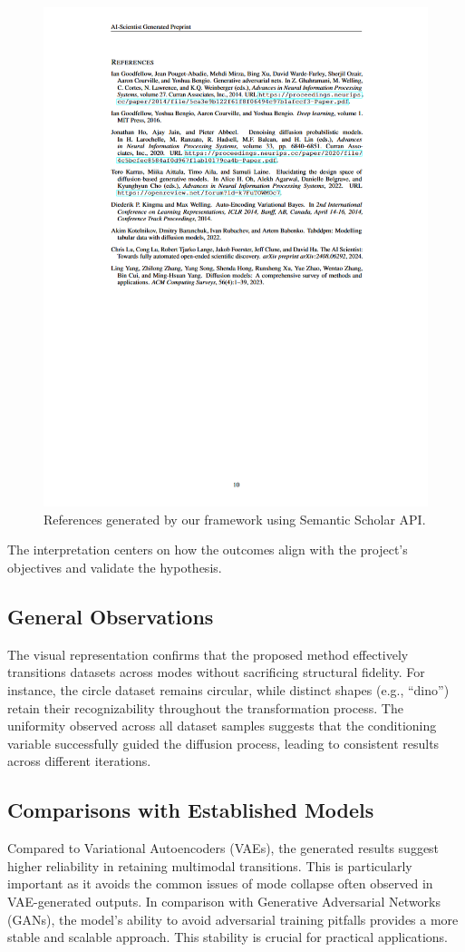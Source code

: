 \begin{figure}[ht]
    \centering
    \includegraphics[width=\textwidth, height=\textwidth]{images/4.png}
    \caption{References generated by our framework using Semantic Scholar API.}
    \label{fig:output_c} %
\end{figure}
The interpretation centers on how the outcomes align with the project's objectives and validate the hypothesis.
\subsection{General Observations}
The visual representation confirms that the proposed method effectively transitions datasets across modes without sacrificing structural fidelity. For instance, the circle dataset remains circular, while distinct shapes (e.g., ``dino'') retain their recognizability throughout the transformation process. The uniformity observed across all dataset samples suggests that the conditioning variable successfully guided the diffusion process, leading to consistent results across different iterations.

\subsection{Comparisons with Established Models}
Compared to Variational Autoencoders (VAEs), the generated results suggest higher reliability in retaining multimodal transitions. This is particularly important as it avoids the common issues of mode collapse often observed in VAE-generated outputs. In comparison with Generative Adversarial Networks (GANs), the model's ability to avoid adversarial training pitfalls provides a more stable and scalable approach. This stability is crucial for practical applications.

